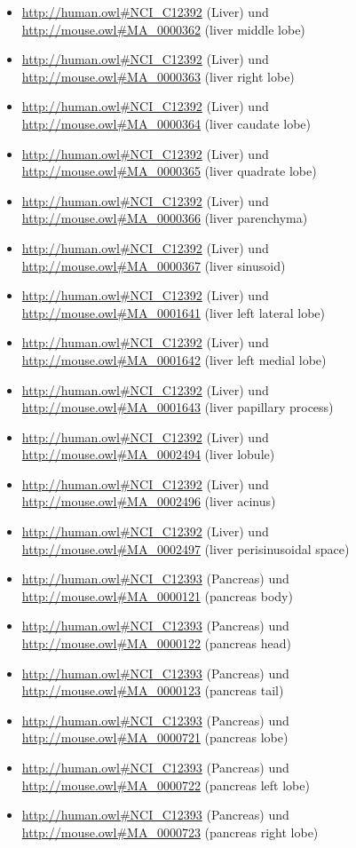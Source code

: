 \begin{itemize}
	\item \url{http://human.owl#NCI_C12392} (Liver) und \url{http://mouse.owl#MA_0000362} (liver middle lobe)
	\item \url{http://human.owl#NCI_C12392} (Liver) und \url{http://mouse.owl#MA_0000363} (liver right lobe)
	\item \url{http://human.owl#NCI_C12392} (Liver) und \url{http://mouse.owl#MA_0000364} (liver caudate lobe)
	\item \url{http://human.owl#NCI_C12392} (Liver) und \url{http://mouse.owl#MA_0000365} (liver quadrate lobe)
	\item \url{http://human.owl#NCI_C12392} (Liver) und \url{http://mouse.owl#MA_0000366} (liver parenchyma)
	\item \url{http://human.owl#NCI_C12392} (Liver) und \url{http://mouse.owl#MA_0000367} (liver sinusoid)
	\item \url{http://human.owl#NCI_C12392} (Liver) und \url{http://mouse.owl#MA_0001641} (liver left lateral lobe)
	\item \url{http://human.owl#NCI_C12392} (Liver) und \url{http://mouse.owl#MA_0001642} (liver left medial lobe)
	\item \url{http://human.owl#NCI_C12392} (Liver) und \url{http://mouse.owl#MA_0001643} (liver papillary process)
	\item \url{http://human.owl#NCI_C12392} (Liver) und \url{http://mouse.owl#MA_0002494} (liver lobule)
	\item \url{http://human.owl#NCI_C12392} (Liver) und \url{http://mouse.owl#MA_0002496} (liver acinus)
	\item \url{http://human.owl#NCI_C12392} (Liver) und \url{http://mouse.owl#MA_0002497} (liver perisinusoidal space)
	\item \url{http://human.owl#NCI_C12393} (Pancreas) und \url{http://mouse.owl#MA_0000121} (pancreas body)
	\item \url{http://human.owl#NCI_C12393} (Pancreas) und \url{http://mouse.owl#MA_0000122} (pancreas head)
	\item \url{http://human.owl#NCI_C12393} (Pancreas) und \url{http://mouse.owl#MA_0000123} (pancreas tail)
	\item \url{http://human.owl#NCI_C12393} (Pancreas) und \url{http://mouse.owl#MA_0000721} (pancreas lobe)
	\item \url{http://human.owl#NCI_C12393} (Pancreas) und \url{http://mouse.owl#MA_0000722} (pancreas left lobe)
	\item \url{http://human.owl#NCI_C12393} (Pancreas) und \url{http://mouse.owl#MA_0000723} (pancreas right lobe)

\end{itemize}
